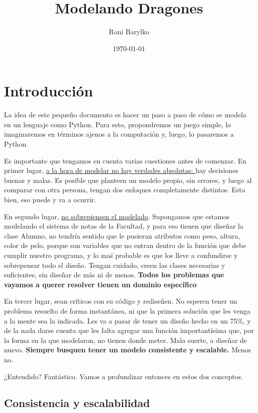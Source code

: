 \documentclass{article}
\title{Modelando Dragones}
\author{Roni Barylko}
\date{\today}
\begin{document}
\maketitle

\section{Introducción}

La idea de este pequeño documento es hacer un paso a paso de cómo se modela en un lenguaje como Python. Para esto, propondremos un juego simple, lo imaginaremos en términos ajenos a la computación y, luego, lo pasaremos a Python.

Es importante que tengamos en cuenta varias cuestiones antes de comenzar. En primer lugar, \underline{a la hora de modelar no hay verdades absolutas: }hay decisiones buenas y malas. Es posible que planteen un modelo propio, sin errores, y luego al comparar con otra persona, tengan dos enfoques completamente distintos. Esta bien, eso puede y va a ocurrir. 

En segundo lugar, \underline{no sobrepiensen el modelado}. Supongamos que estamos modelando el sistema de notas de la Facultad, y para eso tienen que diseñar la clase Alumno, no tendría sentido que le pusieran atributos como peso, altura, color de pelo, porque son variables que no entran dentro de la función que debe cumplir nuestro programa, y lo maś probable es que los lleve a confundirse y sobrepensar todo el diseño. Tengan cuidado, creen las clases necesarias y suficientes, sin diseñar de más ni de menos. \textbf{Todos los problemas que vayamos a querer resolver tienen un dominio específico}

En tercer lugar, sean críticos con su código y rediseñen. No esperen tener un problema resuelto de forma instantánea, ni que la primera solución que les venga a la mente sea la indicada. Les va a pasar de tener un diseño hecho en un 75\%, y de la nada darse cuenta que les falta agregar una función importantísima que, por la forma en la que modelaron, no tienen donde meter. Mala suerte, a diseñar de nuevo. \textbf{Siempre busquen tener un modelo consistente y escalable.} Menos no.

¿Entendido? Fantástico. Vamos a profundizar entonces en estos dos conceptos.

\subsection{Consistencia y escalabilidad}
\end{document}
